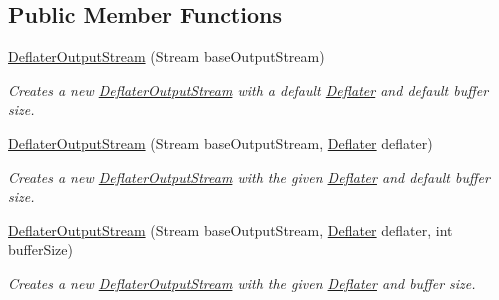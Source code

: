 \subsection*{Public Member Functions}
\begin{DoxyCompactItemize}
\item 
\hyperlink{class_i_c_sharp_code_1_1_sharp_zip_lib_1_1_zip_1_1_compression_1_1_streams_1_1_deflater_output_stream_af11fca20044751df853e67264fb05ee5}{Deflater\+Output\+Stream} (Stream base\+Output\+Stream)
\begin{DoxyCompactList}\small\item\em Creates a new \hyperlink{class_i_c_sharp_code_1_1_sharp_zip_lib_1_1_zip_1_1_compression_1_1_streams_1_1_deflater_output_stream}{Deflater\+Output\+Stream} with a default \hyperlink{class_i_c_sharp_code_1_1_sharp_zip_lib_1_1_zip_1_1_compression_1_1_deflater}{Deflater} and default buffer size. \end{DoxyCompactList}\item 
\hyperlink{class_i_c_sharp_code_1_1_sharp_zip_lib_1_1_zip_1_1_compression_1_1_streams_1_1_deflater_output_stream_a2715b711ea6e8cb17a58898d0571f2f2}{Deflater\+Output\+Stream} (Stream base\+Output\+Stream, \hyperlink{class_i_c_sharp_code_1_1_sharp_zip_lib_1_1_zip_1_1_compression_1_1_deflater}{Deflater} deflater)
\begin{DoxyCompactList}\small\item\em Creates a new \hyperlink{class_i_c_sharp_code_1_1_sharp_zip_lib_1_1_zip_1_1_compression_1_1_streams_1_1_deflater_output_stream}{Deflater\+Output\+Stream} with the given \hyperlink{class_i_c_sharp_code_1_1_sharp_zip_lib_1_1_zip_1_1_compression_1_1_deflater}{Deflater} and default buffer size. \end{DoxyCompactList}\item 
\hyperlink{class_i_c_sharp_code_1_1_sharp_zip_lib_1_1_zip_1_1_compression_1_1_streams_1_1_deflater_output_stream_a8974b4f41beeceb684ab4c349c18b5a3}{Deflater\+Output\+Stream} (Stream base\+Output\+Stream, \hyperlink{class_i_c_sharp_code_1_1_sharp_zip_lib_1_1_zip_1_1_compression_1_1_deflater}{Deflater} deflater, int buffer\+Size)
\begin{DoxyCompactList}\small\item\em Creates a new \hyperlink{class_i_c_sharp_code_1_1_sharp_zip_lib_1_1_zip_1_1_compression_1_1_streams_1_1_deflater_output_stream}{Deflater\+Output\+Stream} with the given \hyperlink{class_i_c_sharp_code_1_1_sharp_zip_lib_1_1_zip_1_1_compression_1_1_deflater}{Deflater} and buffer size. \end{DoxyCompactList}\item 

\end{DoxyCompactItemize}
